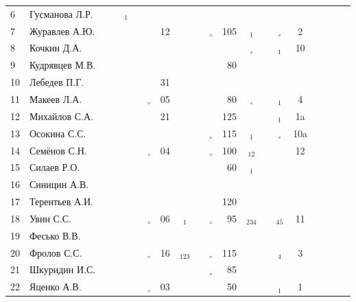 \documentclass[a4paper,11pt]{article}
\newcommand*\OK{&\small \ding{51}$\!\!_\circ$} %
\newcommand*\Ok{&\small \ding{51}$\!\!_\circ$} %
\newcommand*\ok{&{\small \ding{51}}} %
\newcommand*\no{&{\small }} %
\newcommand*\da{&{\small\ding{48}$\!\!_1$}} %
\newcommand*\ab{&{\small\ding{48}$\!\!_{12}$}} %
\newcommand*\dabc{&{\small\ding{48}$\!\!_{123}$}} %
\newcommand*\dd{&{\small\ding{48}$\!\!_4$}} %
\newcommand*\bd{&{\small\ding{48}$\!\!_{234}$}} %
\newcommand*\de{&{\small\ding{48}$\!\!_{45}$}} %
\begin{document}
\begin{tabular}{l|l|cccccccccrcccccccc}
 6&Гусманова Л.Р.  \ok\ok\da\ok\no\no\no  \no\no \no\no\no\no \no&&&&\\
 7&Журавлев А.Ю.   \no\no\no\no\ok&12\ok  \ok\OK&105\da\ok\Ok&  2&&&&\\
 8&Кочкин Д.А.     \no\no\no\no\ok\ok\no  \ok\no \no\Ok\no\da& 10&&&&\\
 9&Кудрявцев М.В.  \no\no\ok\ok\no\no\no  \ok\ok& 80\ok\ok\no \no&&&&\\
10&Лебедев П.Г.    \ok\ok\no\ok\ok&31\no  \ok\no \no\no\no\no \no&&&&\\
11&Макеев Л.А.     \ok\ok\ok\ok\OK&05\ok  \ok\ok& 80\Ok\ok\da&  4&&&&\\
12&Михайлов С.А.   \no\no\ok\ok\ok&21\no  \ok\ok&125\ok\ok\da& 1a&&&&\\
13&Осокина С.С.    \ok\ok\ok\ok\no\no\ok  \ok\OK&115\da\no\Ok&10a&&&&\\
14&Семёнов С.Н.    \ok\ok\ok\ok\OK&04\ok  \ok\OK&100\ab\ok\ok& 12&&&&\\
15&Силаев Р.О.     \ok\ok\no\no\no\no\no  \no\ok& 60\da\ok\no \no&&&&\\
16&Синицин А.В.    \ok\ok\no\ok\no\no\no  \no\no \no\no\no\no \no&&&\\
17&Терентьев А.И.  \ok\ok\ok\ok\no\no\no  \no\ok&120\no\no\no \no&&&&\\
18&Увин С.С.       \ok\ok\ok\ok\OK&06\da  \ok\OK& 95\bd\ok\de& 11&&&&\\
19&Фесько В.В.     \no\no\no\no\no\no\no  \no\no \no\no\no\no \no&&&&\\
20&Фролов С.С.     \ok\ok\ok\ok\OK&16\dabc\ok\OK&115\ok\ok\dd&  3&&&&\\ 
21&Шкуридин И.С.   \ok\ok\ok\ok\ok\no\ok  \ok\OK& 85\ok\ok\no \no&&&&\\
22&Яценко А.В.     \ok\ok\ok\ok\OK&03\ok  \ok\ok& 50\ok\ok\da&  1&&&&\\ 
\bottomrule
\end{tabular} 
\newpage
\end{document}
